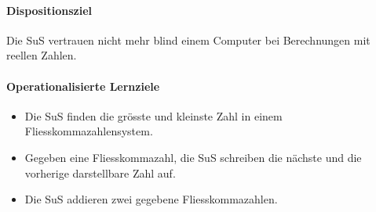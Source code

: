 \documentclass{article}
\begin{document}
\paragraph{Dispositionsziel} Die SuS vertrauen nicht mehr blind einem Computer bei Berechnungen mit reellen Zahlen.

\paragraph{Operationalisierte Lernziele}
\begin{itemize}
\item Die SuS finden die grösste und kleinste Zahl in einem Fliesskommazahlensystem.
\item Gegeben eine Fliesskommazahl, die SuS schreiben die nächste und die vorherige darstellbare Zahl auf.
\item Die SuS addieren zwei gegebene Fliesskommazahlen.
\end{itemize}
\end{document}
